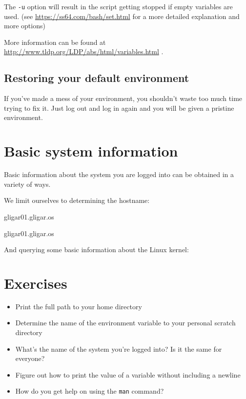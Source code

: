 The \lstinline|-u| option will result in the script getting stopped if empty variables are used.
(see \url{https://ss64.com/bash/set.html} for a more detailed explanation and more options)

More information can be found at \url{http://www.tldp.org/LDP/abs/html/variables.html} .

\subsection{Restoring your default environment}

If you've made a mess of your environment, you shouldn't waste too much time
trying to fix it. Just log out and log in again and you will be given a
pristine environment.

\section{Basic system information}

Basic information about the system you are logged into can be obtained in a variety of ways.

We limit ourselves to determining the hostname:

\begin{prompt}
  gligar01.gligar.os

  gligar01.gligar.os
\end{prompt}

And querying some basic information about the Linux kernel:


\section{Exercises}

\begin{itemize}
    \item Print the full path to your home directory
    \item Determine the name of the environment variable to your personal scratch directory
    \item What's the name of the system you're logged into? Is it the same for everyone?
    \item Figure out how to print the value of a variable without including a newline
    \item How do you get help on using the \lstinline|man| command?
\end{itemize}
